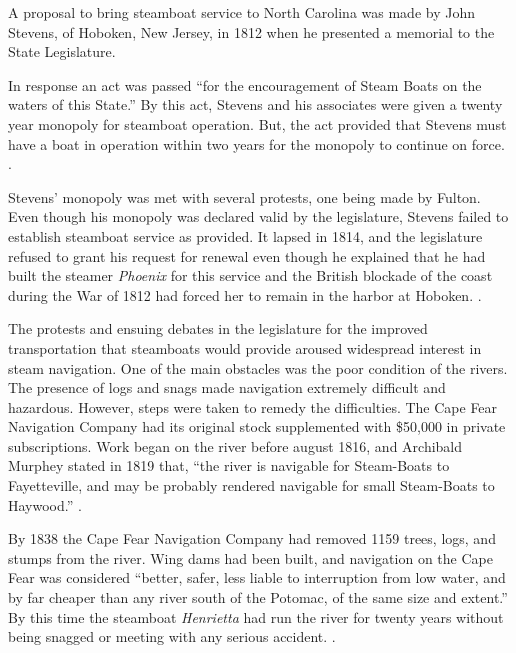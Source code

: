 \documentclass[11pt, a5paper, openright]{book}
\newcommand{\steamer}[1]{\textit{#1}\index{#1,~steamer}}
\begin{document}
A proposal to bring steamboat service to North Carolina was made by
John Stevens, of Hoboken, New Jersey, in 1812 when he presented a
memorial to the State Legislature.\par

In response an act was passed ``for the encouragement of Steam Boats
on the waters of this State.''  By this act, Stevens and his
associates were given a twenty year monopoly for steamboat operation.
But, the act provided that Stevens must have a boat in operation
within two years for the monopoly to continue on force.
\citep[12]{sloanth}.\par

Stevens' monopoly was met with several protests, one being made by
Fulton.  Even though his monopoly was declared valid by the
legislature, Stevens failed to establish steamboat service as
provided.  It lapsed in 1814, and the legislature refused to grant his
request for renewal even though he explained that he had built the
steamer \textit{Phoenix} for this service and the British blockade of
the coast during the War of 1812 had forced her to remain in the
harbor at Hoboken.  \citep[1-3]{turlingtonsw}.\par

The protests and ensuing debates in the legislature for the improved
transportation that steamboats would provide aroused widespread
interest in steam navigation.  One of the main obstacles was the poor
condition of the rivers.  The presence of logs and snags made
navigation extremely difficult and hazardous.  However, steps were
taken to remedy the difficulties.  The Cape Fear Navigation Company
had its original stock supplemented with \$50,000 in private
subscriptions.  Work began on the river before august 1816, and
Archibald Murphey stated in 1819 that, ``the river is navigable for
Steam-Boats to Fayetteville, and may be probably rendered navigable
for small Steam-Boats to Haywood.''  \citep[7, 11]{turlingtonsw}.\par

By 1838 the Cape Fear Navigation Company had removed 1159 trees, logs,
and stumps from the river.  Wing dams had been built, and navigation
on the Cape Fear was considered ``better, safer, less liable to
interruption from low water, and by far cheaper than any river south
of the Potomac, of the same size and extent.''  By this time the
steamboat \steamer{Henrietta} had run the river for twenty years
without being snagged or meeting with any serious accident.
\citep[12, 13]{turlingtonsw}.\par
\end{document}
